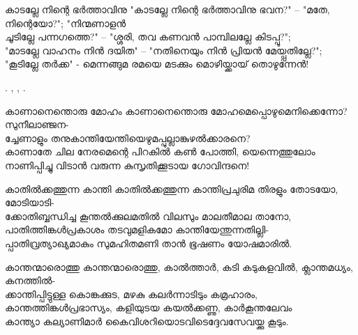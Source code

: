 \begin{enumerate}

\begin{slokam}{\VSr}{\VenM}{കാടല്ലേ നിന്റെ ഭർത്താവിനു}
"കാടല്ലേ നിന്റെ ഭർത്താവിനു ഭവന?" -- "മതേ, നിന്റെയോ?"; "നിന്മണാളൻ\\
ചൂടില്ലേ പന്നഗത്തെ?" -- "ശ്ശരി, തവ കണവൻ പാമ്പിലല്ലേ കിടപ്പൂ?";\\
"മാടല്ലേ വാഹനം നിൻ ദയിത" -- "നതിനെയും നിൻ പ്രിയൻ മേയ്പ്പതില്ലേ?";\\
"കൂടില്ലേ തർക്ക" - മെന്നങ്ങുമ രമയെ മടക്കും മൊഴിയ്ക്കായ്‌ തൊഴുന്നേൻ!
\end{slokam}


. , 
, .

\begin{slokam}{\VSv}{\KND}{കാണാനെന്തൊരു മോഹം}
കാണാനെന്തൊരു മോഹമെപ്പൊഴുമെനിക്കെന്നോ?  സുനീലാഞ്ജന-\\
ച്ചേണാളും തനുകാന്തിയേന്തിയെഴുമപ്പുല്ലാങ്കുഴൽക്കാരനെ?\\
കാണാതേ ചില നേരമെന്റെ പിറകിൽ കൺ പോത്തി, യെന്നെത്തുലോം \\
നാണിപ്പിച്ചു വിടാൻ വരുന്ന കുസൃതിക്കൂടായ ഗോവിന്ദനെ!
\end{slokam}



\begin{slokam}{\VSr}{\KCKP}{കാതില്‍ക്കത്തുന്ന കാന്തി}
കാതില്‍ക്കത്തുന്ന കാന്തിപ്രചുരിമ തിരളും തോടയോ, മോടിയാടി-\\
ക്കോതിബ്ബന്ധിച്ച കൂന്തല്‍ക്കുലമതില്‍ വിലസും മാലതീമാല താനോ,\\
പാതിത്തിങ്കള്‍പ്രകാശം തടവുമളികമോ കാന്തിയേന്തുന്നതില്ലി-\\
പ്പാതിവ്രത്യാഖ്യമാകും സുമഹിതമണി താന്‍ ഭൂഷണം യോഷമാരില്‍.
\end{slokam}





\begin{slokam}{\VSr}{\KKT}{കാന്തന്മാരൊത്തു}
കാന്തന്മാരൊത്തു, കാൽത്താർ, കടി കടുകളവിൽ, ക്ലാന്തമധ്യം, കനത്തിൽ-\\
ക്കാന്തിപ്പിട്ടുള്ള കൊങ്കക്കുട, മഴകു കലർന്നാടിടും കമ്രഹാരം,\\
കാന്തത്തിങ്കള്‍പ്രഭാസ്യം, കളിയുടയ കയൽക്കണ്ണു, കാർകൂന്തലേവം\\
കാന്ത്യാ കല്യാണിമാർ കൈവിശറിയൊടവിടെദ്ദേവസേവയ്ക്കു കൂടും.
\end{slokam}


\end{enumerate}
